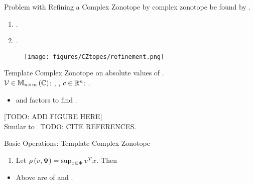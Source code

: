 \begin{frame}{Problem with Refining a Complex Zonotope}
\negemph{*}  by complex
zonotope  be found by .
%
\begin{enumerate}
\item {}.
\item {}.
\end{enumerate}
%
\begin{figure}
\center
\texttt{[image: figures/CZtopes/refinement.png]}
\end{figure}
%
\end{frame}
%
\begin{frame}{Template Complex Zonotope}
 on absolute values of .\\[0.5em]

{\small
${\mathcal{V}\in\mathbb{M}_{n\times m}\left(\mathbb{C}\right)}$: ,
,
${c\in\mathbb{R}^n}$: .
}
%
\begin{block}{}
%
\end{block}
%
\begin{itemize}
\item {} and  factors to find .
\end{itemize}
%
[TODO: ADD FIGURE HERE]\\
Similar to ~{TODO: CITE REFERENCES}.
\end{frame}
%
\begin{frame}{Basic Operations: Template Complex Zonotope}
%
\begin{enumerate}
\item {\small Let $\rho\left(v,\Psi\right)=\sup_{x\in\Psi}v^Tx$}. Then \\
\eqnemph{
\[
\supp{v}{\real\lt(\tcztope{\ptemp}{\cen}{\sfact}\rt)}=v^Tc+\absolute{v^T\ptemp}\sfact.
\]
}
\end{enumerate}
%
\begin{itemize}
\item Above are  of 
and .
\end{itemize}
%
\end{frame}
